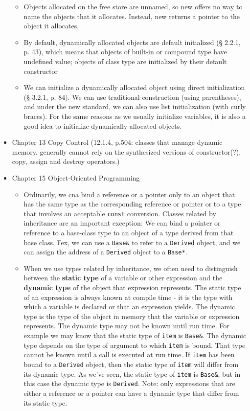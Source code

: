 \documentclass[twoside,english]{uiofysmaster}
\begin{document}
\begin{itemize}
\begin{itemize}
		\item Objects allocated on the free store are unnamed, so new offers no way to name the objects that it allocates. Instead, new returns a pointer to the object it allocates.
		\item By default, dynamically allocated objects are default initialized (§ 2.2.1, p. 43), which means that objects of built-in or compound type have undefined value; objects of class type are initialized by their default constructor
		\item We can initialize a dynamically allocated object using direct initialization (§ 3.2.1, p. 84). We can use traditional construction (using parentheses), and under the new standard, we can also use list initialization (with curly braces). For the same reasons as we usually initialize variables, it is also a good idea to initialize dynamically allocated objects.
	\end{itemize}
	\item Chapter 13 Copy Control (12.1.4, p.504: classes that manage dynamic memory, generally cannot rely on the synthesized versions of constructor(?), copy, assign and destroy operators.)
	\item Chapter 15 Object-Oriented Programming
	\begin{itemize}
		\item Ordinarily, we cna bind a reference or a pointer only to an object that has the same type as the corresponding reference or pointer or to a type that involves an acceptable \texttt{const} conversion. Classes related by inheritance are an important exception: We can bind a pointer or reference to a base-class type to an object of a type derived from that base class. Fex, we can use a \texttt{Base\&} to refer to a \texttt{Derived} object, and we can assign the address of a \texttt{Derived} object to a \texttt{Base*}.
		\item When we use types related by inheritance, we often need to distinguish between the \textbf{static type} of a variable or other expression and the \textbf{dynamic type} of the object that expression represents. The static type of an expression is always known at compile time - it is the type with which a variable is declared or that an expression yields. The dynamic type is the type of the object in memory that the variable or expression represents. The dynamic type may not be known until run time. For example we may know that the static type of \texttt{item} is \texttt{Base\&}. The dynamic type depends on the type of argument to which \texttt{item} is bound. That type cannot be known until a call is executed at run time. If \texttt{item} has been bound to a \texttt{Derived} object, then the static type of \texttt{item} will differ from its dynamic type. As we've seen, the static type of \texttt{item} is \texttt{Base\&}, but in this case the dynamic type is \texttt{Derived}. Note: only expressions that are either a reference or a pointer can have a dynamic type that differ from its static type.
	\end{itemize}
\end{itemize}
\cite{Lippman2013}
\end{document}
